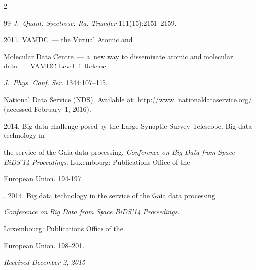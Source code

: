 \begin{multicols}{2}
{{\begin{thebibliography}{99}
\textit{J.~Quant. Spectrosc. Ra. Transfer} 111(15):2151--2159.




 2011. VAMDC~--- the Virtual Atomic and 


Molecular Data Centre~--- a~new way to disseminate atomic and molecular data~--- VAMDC Level~1 Release. 


\textit{J.~Phys. Conf. Ser.} 1344:107--115.




National Data Service (NDS). Available at: {\sf http://www. nationaldataservice.org/} (accessed February~1, 2016).




 2014. Big data challenge posed by the Large Synoptic Survey Telescope. Big data technology in 


the service of the Gaia data processing. \textit{Conference on Big Data from Space BiDS'14 Proceedings}. Luxembourg: Publications Office of the 


European Union. 194-197.




. 2014. Big data technology in the service of the Gaia data processing. 


\textit{Conference on Big Data from Space BiDS'14 Proceedings}. 


Luxembourg: Publications Office of the 


European Union. 198--201.


\end{thebibliography}





 }


 }





\end{multicols}





\vspace*{-3pt}





\hfill{\small\textit{Received December 2, 2015}}








